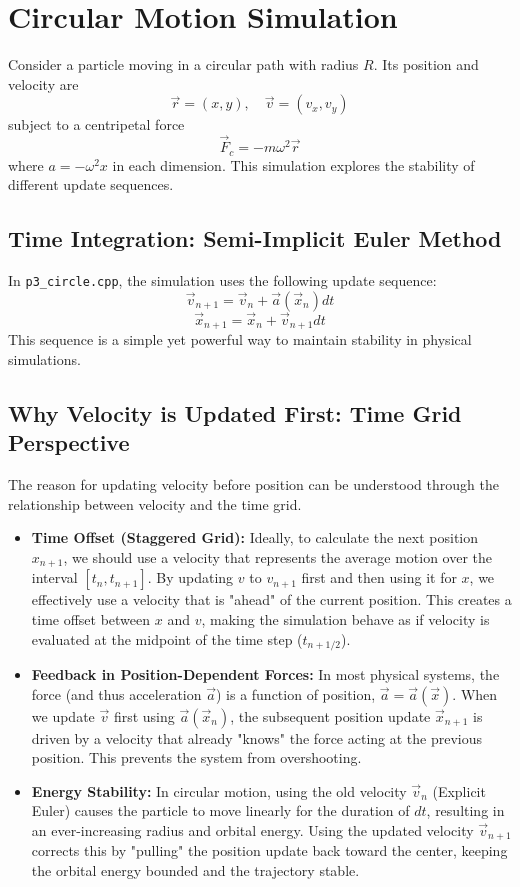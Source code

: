 \section*{Circular Motion Simulation}

Consider a particle moving in a circular path with radius $R$. Its position and velocity are
\[
\vec{r} = (x, y), \quad \vec{v} = (v_x, v_y)
\]
subject to a centripetal force
\[
\vec{F}_c = - m \omega^2 \vec{r}
\]
where $a = -\omega^2 x$ in each dimension. This simulation explores the stability of different update sequences.

\subsection*{Time Integration: Semi-Implicit Euler Method}

In \texttt{p3\_circle.cpp}, the simulation uses the following update sequence:
\[
\vec{v}_{n+1} = \vec{v}_n + \vec{a}(\vec{x}_n) dt
\]
\[
\vec{x}_{n+1} = \vec{x}_n + \vec{v}_{n+1} dt
\]
This sequence is a simple yet powerful way to maintain stability in physical simulations.

\subsection*{Why Velocity is Updated First: Time Grid Perspective}

The reason for updating velocity before position can be understood through the relationship between velocity and the time grid.

\begin{itemize}
    \item \textbf{Time Offset (Staggered Grid):} Ideally, to calculate the next position $x_{n+1}$, we should use a velocity that represents the average motion over the interval $[t_n, t_{n+1}]$. By updating $v$ to $v_{n+1}$ first and then using it for $x$, we effectively use a velocity that is "ahead" of the current position. This creates a time offset between $x$ and $v$, making the simulation behave as if velocity is evaluated at the midpoint of the time step ($t_{n+1/2}$).
    
    \item \textbf{Feedback in Position-Dependent Forces:} In most physical systems, the force (and thus acceleration $\vec{a}$) is a function of position, $\vec{a} = \vec{a}(\vec{x})$. When we update $\vec{v}$ first using $\vec{a}(\vec{x}_n)$, the subsequent position update $\vec{x}_{n+1}$ is driven by a velocity that already "knows" the force acting at the previous position. This prevents the system from overshooting.
    
    \item \textbf{Energy Stability:} In circular motion, using the old velocity $\vec{v}_n$ (Explicit Euler) causes the particle to move linearly for the duration of $dt$, resulting in an ever-increasing radius and orbital energy. Using the updated velocity $\vec{v}_{n+1}$ corrects this by "pulling" the position update back toward the center, keeping the orbital energy bounded and the trajectory stable.
\end{itemize}

